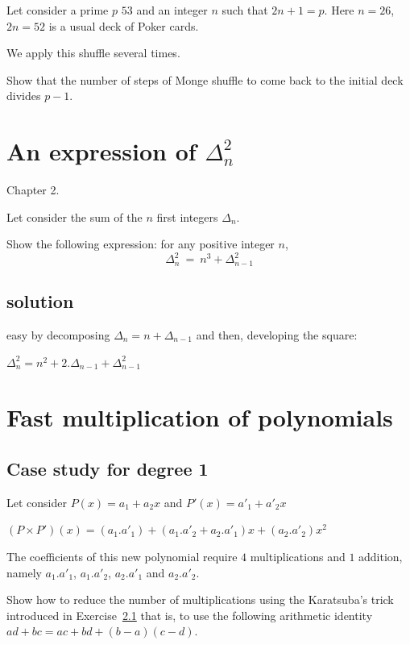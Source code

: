 \documentclass{article}[12pt]
\begin{document}
Let consider a prime $p$ $53$ and an integer $n$ such that $2n+1=p$.
Here $n=26$, $2n=52$ is a usual deck of Poker cards. 

We apply this shuffle several times.

Show that the number of steps of Monge shuffle to come back to the initial deck divides $p-1$. 



\section{An expression of $\Delta_n^2$}

Chapter 2.

Let consider the sum of the $n$ first integers $\Delta_n$.

Show the following expression:
for any positive integer $n$,
\[ \Delta_{n}^2 \ = \ n^3 + \Delta_{n-1}^2 \]

\subsection{solution}

easy by decomposing $\Delta_{n} = n + \Delta_{n-1}$
and then, developing the square:

 $\Delta_{n}^2 = n^2 + 2.\Delta_{n-1} + \Delta_{n-1}^2$



\section{Fast multiplication of polynomials}


\subsection{Case study for degree 1}

Let consider $P(x) = a_1 + a_2 x $ and $P'(x) = a'_1 + a'_2 x $

$(P \times P')(x) = (a_1.a'_1) + (a_1.a'_2 + a_2.a'_1) x + (a_2.a'_2) x^2$

The coefficients of this new polynomial require $4$ multiplications and $1$ addition, 
namely $a_1.a'_1$, $a_1.a'_2$, $a_2.a'_1$ and $a_2.a'_2$.
\bigskip

Show how to reduce the number of multiplications using the Karatsuba's trick 
introduced in Exercise~\ref{} that is, 
to use the following arithmetic identity $ad+bc = ac + bd + (b-a)(c-d)$.
\end{document}
